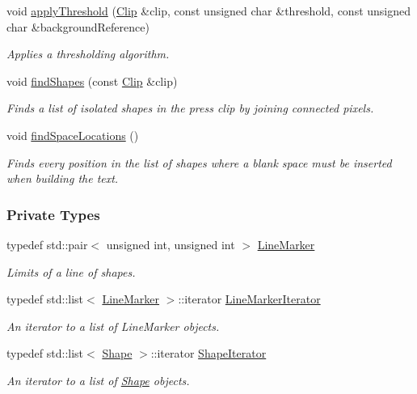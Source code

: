 \begin{CompactItemize}
void \hyperlink{class_segmenter_6854315e3320f9d9a8ece14cbb8570ee}{applyThreshold} (\hyperlink{class_clip}{Clip} \&clip, const unsigned char \&threshold, const unsigned char \&backgroundReference)
\begin{CompactList}\small\item\em Applies a thresholding algorithm. \item\end{CompactList}\item 
void \hyperlink{class_segmenter_465c8e755bb56d247add080a04377520}{findShapes} (const \hyperlink{class_clip}{Clip} \&clip)
\begin{CompactList}\small\item\em Finds a list of isolated shapes in the press clip by joining connected pixels. \item\end{CompactList}\item 
void \hyperlink{class_segmenter_7f4ab775f61d92c4d051f6ef4685cf6f}{findSpaceLocations} ()
\begin{CompactList}\small\item\em Finds every position in the list of shapes where a blank space must be inserted when building the text. \item\end{CompactList}\end{CompactItemize}
\subsubsection*{Private Types}
\begin{CompactItemize}
\item 
typedef std::pair$<$ unsigned int, unsigned int $>$ \hyperlink{class_segmenter_ae134abed2f1d55197820f4027d10999}{LineMarker}
\begin{CompactList}\small\item\em Limits of a line of shapes. \item\end{CompactList}\item 
typedef std::list$<$ \hyperlink{class_segmenter_ae134abed2f1d55197820f4027d10999}{LineMarker} $>$::iterator \hyperlink{class_segmenter_b3190459e52101e495e49e936bbb6440}{LineMarkerIterator}
\begin{CompactList}\small\item\em An iterator to a list of LineMarker objects. \item\end{CompactList}\item 
typedef std::list$<$ \hyperlink{class_shape}{Shape} $>$::iterator \hyperlink{class_segmenter_1190be7ec081a96ee2ae91e0bb256a0d}{ShapeIterator}
\begin{CompactList}\small\item\em An iterator to a list of \hyperlink{class_shape}{Shape} objects. \item\end{CompactList}\end{CompactItemize}
